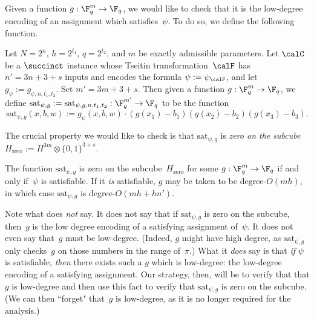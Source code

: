 Given a function $g:\F_q^m \rightarrow \F_q$,
we would like to check that it is the low-degree encoding of an assignment which satisfies~$\psi$.
To do so, we define the following function.
\begin{definition}\label{def:formula-function}
Let $N=2^n$, $h = 2^{t_1}$, $q= 2^{t_2}$, and $m$ be exactly admissible parameters.
Let $\calC$ be a $\succinct$ instance whose Tseitin transformation~$\calF$
has $n' = 3n + 3 + s$ inputs and encodes the formula $\psi := \psi_{\calF}$,
and let $g_\psi := g_{\psi, n, t_1, t_2}$.
Set $m' = 3m + 3 + s$.
Then given a function $g:\F_q^m \rightarrow \F_q$, 
we define $\mathrm{sat}_{\psi,g} := \mathrm{sat}_{\psi,g, n, t_1, t_2} : \F_q^{m'} \rightarrow \F_q$ to be the function
\begin{equation*}
\mathrm{sat}_{\psi,g}(x, b,w) := g_{\psi}(x, b, w) \cdot (g(x_1)-b_1) (g(x_2)-b_2) (g(x_3)-b_3).
\end{equation*}
\end{definition}
The crucial property we would like to check is that $\mathrm{sat}_{\psi, g}$ is \emph{zero on the subcube $H_{\mathrm{zero}} := H^{3m} \otimes \{0, 1\}^{3+s}$}.
\begin{proposition}\label{prop:zero-on-subcube}
The function $\mathrm{sat}_{\psi,g}$ is zero on the subcube~$H_{\mathrm{zero}}$ for some $g:\F_q^m\rightarrow \F_q$ if and only if~$\psi$ is satisfiable.
If it \emph{is} satisfiable, $g$ may be taken to be degree-$O(mh)$, in which case $\mathrm{sat}_{\psi,g}$ is  degree-$O(mh + h n')$.
\end{proposition}
Note what  does \emph{not} say.
It does not say that if $\mathrm{sat}_{\psi,g}$ is zero on the subcube, then~$g$ is the low degree encoding of a satisfying assignment of~$\psi$.
It does not even say that~$g$ must be low-degree.
(Indeed, $g$ might have high degree, as $\mathrm{sat}_{\psi,g}$ only checks~$g$ on those numbers in the range of~$\pi$.)
What it \emph{does} say is that \emph{if} $\psi$ is satisfiable, \emph{then} there exists such a $g$ which is low-degree: the low-degree encoding of a satisfying assignment.
Our strategy, then, will be to verify that that $g$ is low-degree and then use this fact to verify that $\mathrm{sat}_{\psi,g}$ is zero on the subcube.
(We can then ``forget" that~$g$ is low-degree, as it is no longer required for the analysis.)

